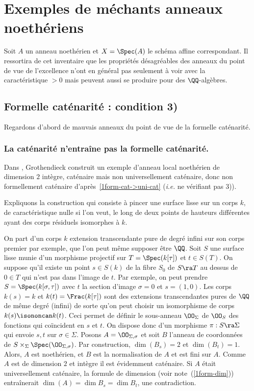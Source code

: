 \documentclass[10pt]{../fichiers-configuration-latex/smfart}
\begin{document}
\section{Exemples de méchants anneaux noethériens}\label{1pathologie} Soit $A$ un anneau noethérien
et $X=\Spec(A)$ le schéma affine correspondant.  Il ressortira de cet inventaire que les propriétés
désagréables des anneaux du point de vue de l'excellence n'ont en général pas seulement à voir avec
la caractéristique $>0$ mais peuvent aussi se produire pour des $\QQ$-algèbres.

\subsection{Formelle caténarité : condition 3)} \label{1ex-non-uni-cat} Regardons d'abord de mauvais
anneaux du point de vue de la formelle caténarité.  \subsubsection{La caténarité n'entraîne pas la
formelle caténarité.} Dans , Grothendieck construit un exemple d'anneau local
noethérien de dimension $2$ intègre, caténaire mais non universellement caténaire, donc non
formellement caténaire d'après~\ref{1form-cat->uni-cat} (\emph{i.e.} ne vérifiant pas 3)).


Expliquons la construction qui consiste à pincer une surface lisse sur un corps $k$, de
caractéristique nulle si l'on veut, le long de deux points de hauteurs différentes ayant des corps
résiduels isomorphes à $k$.


On part d'un corps $k$ extension transcendante pure de degré  infini sur son corps premier par
exemple, que l'on peut même supposer être $\QQ$. Soit $S$ une surface lisse munie d'un morphisme
projectif sur $T=\Spec(k[\tau])$ et $t\in S(T)$. On suppose qu'il existe un point $s\in S(k)$ de la
fibre $S_0$ de $S\ra T$ au dessus de $0\in T$ qui n'est pas dans l'image de $t$. Par exemple, on
peut prendre $S=\Spec(k[\sigma,\tau])$ avec $t$ la section d'image $\sigma=0$ et $s=(1,0)$. Les
corps $k(s)=k$ et $k(t)=\Frac(k[\tau])$ sont des extensions transcendantes pures de $\QQ$ de même
degré (infini) de sorte qu'on peut choisir un isomorphisme de corps $k(s)\isononcan k(t)$.  Ceci
permet de définir le sous-anneau $\OO_\Sigma$ de $\OO_S$ des fonctions qui coïncident en $s$ et $t$.
On dispose donc d'un morphisme $\pi:S\ra \Sigma$ qui envoie $s,t$ sur $\sigma\in\Sigma$.  Posons
$A=\OO_{\Sigma,\sigma}$ et soit $B$ l'anneau de coordonnées de
$S\times_\Sigma\Spec(\OO_{\Sigma,\sigma})$. Par construction, $\dim(B_s)=2$ et $\dim(B_t)=1$. Alors,
$A$ est noethérien, et $B$ est la normalisation de $A$ et est fini sur $A$. Comme $A$ est de
dimension $2$ et intègre il est évidemment caténaire. Si $A$ était universellement caténaire, la
formule de dimension (voir note~(\ref{1form-dim})) entraînerait $\dim(A)=\dim B_s=\dim B_t$, une
contradiction.
\end{document}
